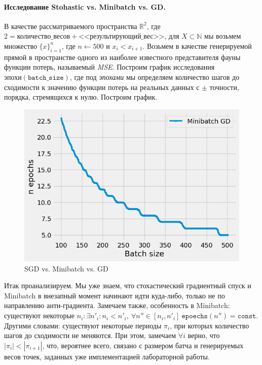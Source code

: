 \documentclass[12pt, a4paper, oneside, final]{article}
\begin{document}
	\paragraph{Исследование Stohastic vs. Minibatch vs. GD.}
	В качестве рассматриваемого пространства $\mathbb{R}^{2}$, где $2 = \texttt{количество\_весов} + \texttt{<<результирующий\_вес>>}$, для $X \subset \mathbb{N}$ мы возьмем множество $\{x\}_{i = 1}^{n}$, где $n \gets 500$ и $x_{i} < x_{i + 1}$.
	Возьмем в качестве генерируемой прямой в пространстве одного из наиболее известного представителя фауны функции потерь, называемый \textit{MSE}.
	Построим график исследования $\texttt{эпохи}(\texttt{batch\_size})$, где под \textit{эпохами} мы определяем количество шагов до сходимости к значению функции потерь на реальных данных с $\pm$ точности, порядка, стремящихся к нулю.
	Построим график.
	\begin{figure}[H]
		\centering
		\includegraphics[scale = 0.55]{Image/T1_ECHOES_BATCHSIEZ.png}
		\caption*{SGD vs. Minibatch vs. GD}
	\end{figure}
	Итак проанализируем.
	Мы уже знаем, что стохастический градиентный спуск и Minibatch в внезапный момент начинают идти куда-либо, только не по направлению анти-градиента.
	Замечаем также, особенность в Minibatch: существуют некоторые $n_{i} : \exists n'_{i} : n_{i} < n'_{i}, ~ \forall n'' \in [n_{i}, n'_{i}] ~ \texttt{epoechs}(n'') = \texttt{const}$.
	Другими словами: существуют некоторые периоды $\pi_{i}$, при которых количество шагов до сходимости не меняются.
	При этом, замечаем $\forall i$ верно, что $|\pi_{i}| < |\pi_{i + 1}|$, что, вероятнее всего, связано с размером батча и генерируемых весов точек, заданных уже имплементацией лабораторной работы.
\end{document}
